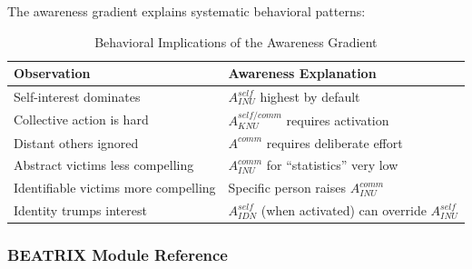 The awareness gradient explains systematic behavioral patterns:

\begin{table}[htbp]
\centering
\caption{Behavioral Implications of the Awareness Gradient}
\label{tab:gradient-implications}
\renewcommand{\arraystretch}{1.3}
\begin{tabular}{@{}ll@{}}
\toprule
\textbf{Observation} & \textbf{Awareness Explanation} \\
\midrule
Self-interest dominates & $A^{self}_{INU}$ highest by default \\
Collective action is hard & $A^{self/comm}_{KNU}$ requires activation \\
Distant others ignored & $A^{comm}$ requires deliberate effort \\
Abstract victims less compelling & $A^{comm}_{INU}$ for ``statistics'' very low \\
Identifiable victims more compelling & Specific person raises $A^{comm}_{INU}$ \\
Identity trumps interest & $A^{self}_{IDN}$ (when activated) can override $A^{self}_{INU}$ \\
\bottomrule
\end{tabular}
\end{table}

\subsubsection{BEATRIX Module Reference}

